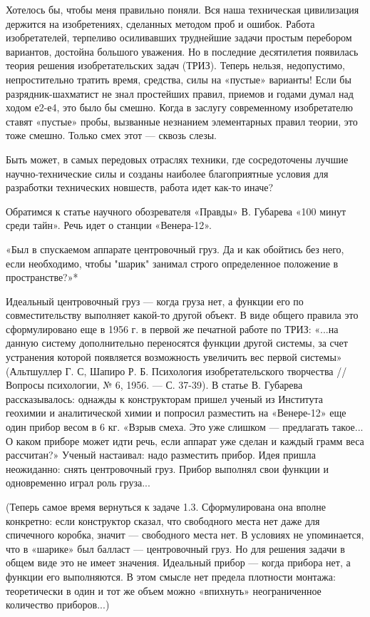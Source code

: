 Хотелось  бы,  чтобы  меня  правильно  поняли.  Вся  наша  техническая
цивилизация держится на изобретениях, сделанных методом проб и ошибок.
Работа изобретателей, терпеливо  осиливавших труднейшие задачи простым
перебором  вариантов,  достойна  большого  уважения.  Но  в  последние
десятилетия  появилась теория  решения изобретательских  задач (ТРИЗ).
Теперь  нельзя, недопустимо,  непростительно тратить  время, средства,
силы  на  «пустые»  варианты!  Если  бы  разрядник-шахматист  не  знал
простейших правил, приемов и годами думал над ходом е2-е4, это было бы
смешно.  Когда в  заслугу  современному  изобретателю ставят  «пустые»
пробы,  вызванные  незнанием  элементарных  правил  теории,  это  тоже
смешно. Только смех этот — сквозь слезы.


Быть  может, в  самых  передовых отраслях  техники, где  сосредоточены
лучшие  научно-технические  силы   и  созданы  наиболее  благоприятные
условия для разработки технических новшеств, работа идет как-то иначе?

Обратимся  к статье  научного обозревателя  «Правды» В.  Губарева «100
минут среди тайн». Речь идет о станции «Венера-12».


«Был в  спускаемом аппарате центровочный  груз. Да и как  обойтись без
него,  если  необходимо,  чтобы "шарик"  занимал  строго  определенное
положение в пространстве?»*

Идеальный  центровочный груз  —  когда  груза нет,  а  функции его  по
совместительству  выполняет  какой-то  другой объект.  В  виде  общего
правила это сформулировано  еще в 1956 г. в первой  же печатной работе
по  ТРИЗ:  «...на  данную систему  дополнительно  переносятся  функции
другой  системы, за  счет  устранения  которой появляется  возможность
увеличить  вес  первой  системы»  (Альтшуллер   Г.  С,  Шапиро  Р.  Б.
Психология изобретательского  творчества //  Вопросы психологии,  № 6,
1956.  — С.  37-39). В  статье В.  Губарева рассказывалось:  однажды к
конструкторам  пришел ученый  из  Института  геохимии и  аналитической
химии и попросил  разместить на «Венере-12» еще один прибор  весом в 6
кг.  «Взрыв смеха.  Это  уже  слишком —  предлагать  такое... О  каком
приборе может идти  речь, если аппарат уже сделан и  каждый грамм веса
рассчитан?»  Ученый настаивал:  надо  разместить  прибор. Идея  пришла
неожиданно: снять  центровочный груз.  Прибор выполнял свои  функции и
одновременно играл роль груза...

(Теперь самое время вернуться к  задаче 1.3. Сформулирована она вполне
конкретно: если конструктор сказал, что  свободного места нет даже для
спичечного  коробка, значит  —  свободного места  нет.  В условиях  не
упоминается, что  в «шарике» был  балласт — центровочный груз.  Но для
решения задачи в общем виде это  не имеет значения. Идеальный прибор —
когда  прибора нет,  а  функции  его выполняются.  В  этом смысле  нет
предела плотности  монтажа: теоретически в  один и тот же  объем можно
«впихнуть» неограниченное количество приборов...)

